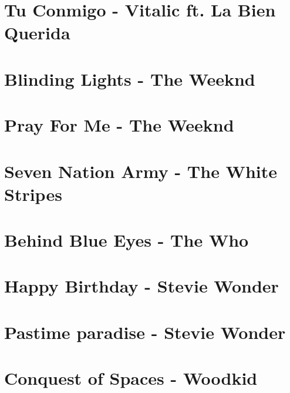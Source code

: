 \documentclass[11pt]{article}
\begin{document}
\section{Tu Conmigo - Vitalic ft. La Bien Querida}


\section{Blinding Lights - The Weeknd}
\begin{guitar}

\end{guitar}

\section{Pray For Me - The Weeknd}
\begin{guitar}

\end{guitar}

\section{Seven Nation Army - The White Stripes}



\section{Behind Blue Eyes - The Who}
\begin{guitar}

\end{guitar}

\section{Happy Birthday - Stevie Wonder}
\begin{guitar}

\end{guitar}



\section{Pastime paradise - Stevie Wonder}
\begin{guitar}

\end{guitar}





\section{Conquest of Spaces - Woodkid}
\begin{guitar}

\end{guitar}
\end{document}
